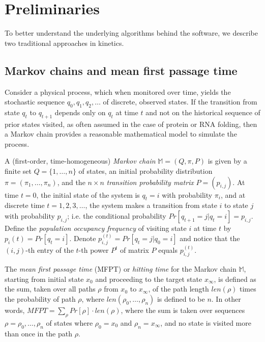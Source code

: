 \section{Preliminaries}
\label{section:algo}

To better understand the underlying algorithms behind the software,
we describe two traditional approaches in kinetics.

\subsection{Markov chains and mean first passage time}

Consider a physical process,
which when monitored over time, yields the stochastic sequence
$q_0,q_1,q_2,\ldots$ of discrete, observed states. If the transition from
state $q_t$ to $q_{t+1}$ depends only on $q_t$ at time
$t$ and not on the historical sequence of prior states visited,
as often assumed in the case of protein or
RNA folding, then a Markov chain provides a reasonable
mathematical model to simulate the process.

A (first-order, time-homogeneous)
{\em Markov chain} $\mathbb{M} = (Q,\pi,P)$ is given by a finite
set $Q = \{ 1,\ldots,n \}$ of states, an initial probability distribution
$\pi = (\pi_1,\ldots,\pi_n)$, and the $n \times n$
{\em transition probability matrix} $P = (p_{i,j})$.
At time $t=0$, the initial state of the system is
$q_t=i$ with probability $\pi_i$, and at discrete time
$t=1,2,3,\ldots$, the system makes a transition from state
$i$ to state $j$ with probability $p_{i,j}$; i.e.
the conditional probability $Pr[ q_{t+1} = j | q_t=i] = p_{i,j}$.
Define the {\em population occupancy frequency} of visiting state
$i$ at time $t$ by $p_{i}(t) = Pr[q_t=i]$.  Denote
$p_{i,j}^{(t)} = Pr[q_t = j | q_0 = i]$ and notice that
the $(i,j)$-th entry of the $t$-th power $P^t$ of matrix $P$  equals
$p_{i,j}^{(t)}$.


The {\em mean first passage time} (MFPT) or
{\em hitting time} for the Markov chain $\mathbb{M}$,
starting from initial state $x_0$ and proceeding
to the target state $x_{\infty}$, is defined
as the sum, taken over all paths $\rho$
from $x_0$ to $x_{\infty}$, of the path length $len(\rho)$ times the probability
of path $\rho$, where $len(\rho_0,\ldots,\rho_n)$ is defined to
be $n$. In other words, $MFPT = \sum_{\rho} Pr[\rho] \cdot len(\rho)$, where
the sum is taken over sequences $\rho=\rho_0,\ldots,\rho_n$ of states
where $\rho_0=x_0$ and $\rho_n=x_{\infty}$, and no state is visited more
than once in the path $\rho$.

